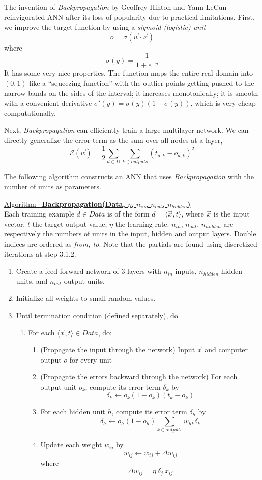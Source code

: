 \documentclass[12pt]{article}  %
\newcommand{\algtitle}[1]{\underline{Algorithm \ {\bf #1}} \vspace*{1mm}\\}
\begin{document}
The invention of {\em Backpropagation} by Geoffrey Hinton and Yann LeCun reinvigorated ANN after its loss of popularity due to practical limitations. First, we improve the target function by using a {\em sigmoid (logistic) unit} $$o = \sigma (\vec{w} \cdot \vec{x})$$ where $$\sigma(y) = \frac{1}{1+e^{-y}}$$ It has some very nice properties. The function maps the entire real domain into $(0,1)$ like a ``squeezing function'' with the outlier points getting pushed to the narrow bands on the sides of the interval; it increases monotonically; it is smooth with a convenient derivative $\sigma'(y) = \sigma(y) (1 - \sigma(y))$, which is very cheap computationally.

Next, {\em Backpropagation} can efficiently train a large multilayer network. We can directly generalize the error term as the sum over all nodes at a layer, $$\mathcal{E}(\vec{w}) = \frac{1}{2} \sum_{d \in D} \sum_{k \in outputs} (t_{d,k} - o_{d,k})^2$$

The following algorithm constructs an ANN that uses {\em Backpropagation} with the number of units as parameters.


\algtitle{Backpropagation(Data, $\eta$, $n_{in}$, $n_{out}$, $n_{hidden}$)}
Each training example $d \in Data$ is of the form $d = \langle \vec{x}, t \rangle$, where $\vec{x}$ is the input vector, $t$ the target output value, $\eta$ the learning rate. $n_{in}$, $n_{out}$, $n_{hidden}$ are respectively the numbers of units in the input, hidden and output layers. Double indices are ordered as {\em from, to}. Note that the partials are found using discretized iterations at step 3.1.2.

\begin{enumerate}
	\item Create a feed-forward network of 3 layers with $n_{in}$ inputs, $n_{hidden}$ hidden units, and $n_{out}$ output units.
	\item Initialize all weights to small random values.
	\item Until termination condition (defined separately), do
		\begin{enumerate}
			\item For each $\langle \vec{x}, t \rangle \in Data$, do:
			\begin{enumerate}
				\item (Propagate the input through the network) Input $\vec{x}$ and computer output $o$ for every unit
				\item (Propagate the errors backward through the network) For each output unit $o_k$, compute its error term $\delta_k$ by $$\delta_k \leftarrow o_k(1-o_k)(t_k-o_k)$$
				\item For each hidden unit $h$, compute its error term $\delta_h$ by $$\delta_h \leftarrow o_h(1-o_h)\sum_{k \in outputs}w_{hk}\delta_{k}$$
				\item Update each weight $w_{ij}$ by $$w_{ij} \leftarrow w_{ij} + \Delta w_{ij}$$ where $$\Delta w_{ij} = \eta \ \delta_j \ x_{ij}$$
			\end{enumerate}
		\end{enumerate}
\end{enumerate}
\end{document}
